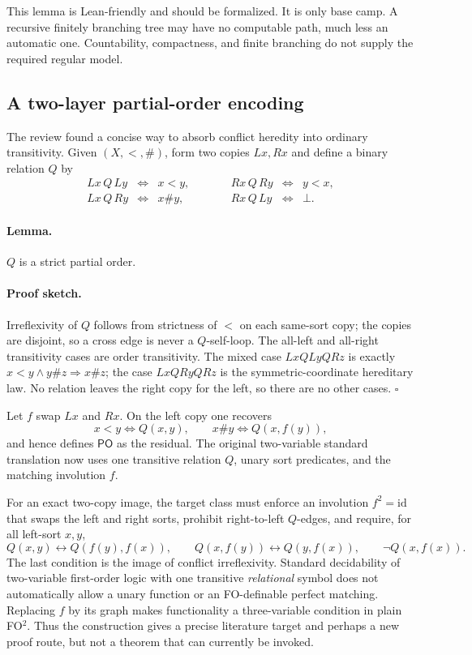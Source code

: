 \documentclass[11pt]{article}
\newcommand{\PO}{\ensuremath{\mathsf{PO}}}
\begin{document}
This lemma is Lean-friendly and should be formalized.  It is only base camp.
A recursive finitely branching tree may have no computable path, much less an
automatic one.  Countability, compactness, and finite branching do not supply
the required regular model.

\subsection{A two-layer partial-order encoding}

The review found a concise way to absorb conflict heredity into ordinary
transitivity.  Given \((X,<,\#)\), form two copies \(Lx,Rx\) and define a
binary relation \(Q\) by
\[
\begin{array}{rclcrcl}
Lx\,Q\,Ly &\Longleftrightarrow& x<y,
&\qquad& Rx\,Q\,Ry &\Longleftrightarrow& y<x,\\
Lx\,Q\,Ry &\Longleftrightarrow& x\#y,
&& Rx\,Q\,Ly &\Longleftrightarrow& \bot.
\end{array}
\]

\paragraph{Lemma.}
\(Q\) is a strict partial order.

\paragraph{Proof sketch.}
Irreflexivity of \(Q\) follows from strictness of \(<\) on each same-sort copy;
the copies are disjoint, so a cross edge is never a \(Q\)-self-loop.
The all-left and all-right transitivity cases are order transitivity.  The mixed
case \(LxQLyQRz\) is exactly
\(x<y\wedge y\#z\Rightarrow x\#z\); the case
\(LxQRyQRz\) is the symmetric-coordinate hereditary law.  No relation leaves
the right copy for the left, so there are no other cases. \(\square\)

Let \(f\) swap \(Lx\) and \(Rx\).  On the left copy one recovers
\[
x<y\iff Q(x,y),\qquad x\#y\iff Q(x,f(y)),
\]
and hence defines \PO{} as the residual.  The original two-variable standard
translation now uses one transitive relation \(Q\), unary sort predicates, and
the matching involution \(f\).

\newpage
\begin{cautionbox}
For an exact two-copy image, the target class must enforce an involution
\(f^2=\mathrm{id}\) that swaps the left and right sorts, prohibit right-to-left
\(Q\)-edges, and require, for all left-sort \(x,y\),
\[
Q(x,y)\leftrightarrow Q(f(y),f(x)),\qquad
Q(x,f(y))\leftrightarrow Q(y,f(x)),\qquad
\neg Q(x,f(x)).
\]
The last condition is the image of conflict irreflexivity.  Standard
decidability of two-variable first-order logic with one transitive
\emph{relational} symbol does not automatically allow a unary function or an
FO-definable perfect matching.  Replacing \(f\) by its graph makes functionality
a three-variable condition in plain FO\(^2\).  Thus the construction gives a
precise literature target and perhaps a new proof route, but not a theorem that
can currently be invoked.
\end{cautionbox}
\end{document}
